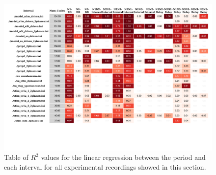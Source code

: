 \begin{figure}
	\includegraphics[width=\textwidth]{./invariants/styled_table_invariants.pdf}
	\caption{Table of $R^2$ values for the linear regression between the period and each interval for all experimental recordings showed in this section.}
	\label{fig:R2 table}
\end{figure}



